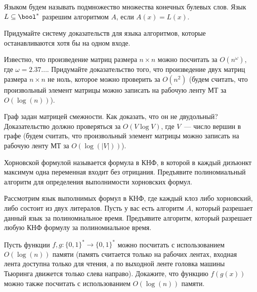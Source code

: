 

Языком будем называть подмножество множества конечных булевых слов. Язык $L \subseteq \bool^*$ разрешим алгоритмом $A$, если $A(x)
= L(x)$.

\begin{task}
	Придумайте систему доказательств для языка алгоритмов, которые останавливаются
    хотя бы на одном входе.
\end{task}

\begin{task}
    Известно, что произведение матриц размера $n \times n$ можно посчитать за $O(n^{\omega})$, где $\omega =  2.37...$. Придумайте
    доказательство того, что произведение двух матриц размера $n \times n$ не ноль, которое можно проверить за $O(n^2)$
    (будем считать, что произвольный элемент матрицы можно записать на рабочую ленту МТ за $O(\log(n))$).
\end{task}

\begin{task}
    Граф задан матрицей смежности. Как доказать, что он не двудольный? Доказательство должно проверяться за $O(V \log V)$, где
    $V$~--- число вершин в графе (будем считать, что произвольный элемент матрицы можно записать на рабочую ленту МТ за
    $O(\log(|V|))$).
\end{task}

\begin{task}
    Хорновской формулой называется формула в КНФ, в которой в каждый дизъюнкт максимум одна переменная входит без
    отрицания. Предъявите полиномиальный алгоритм для определения выполнимости хорновских формул.
\end{task}

\begin{task}
	Рассмотрим язык выполнимых формул в КНФ, где каждый клоз либо хорновский, либо состоит из двух литералов. Пусть у вас есть
    алгоритм $A$, который разрешает данный язык за полиномиальное время. Предъявите алгоритм, который разрешает любую КНФ формулу
    за полиномиальное время.
\end{task}

\begin{task}
    Пусть функции $f, g: \{0, 1\}^* \rightarrow \{0, 1\}^*$ можно посчитать с использованием $O(\log(n))$ памяти (память считается
    только на рабочих лентах, входная лента доступна только для чтения, а по выходной ленте головка машины Тьюринга движется
    только слева направо). Докажите, что функцию $f(g(x))$ можно также посчитать с использованием $O(\log(n))$ памяти.
\end{task}

